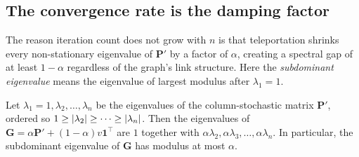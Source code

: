 \subsection{The convergence rate is the damping factor}

The reason iteration count does not grow with $n$ is that teleportation shrinks every non-stationary eigenvalue of $\mathbf{P}'$ by a factor of $\alpha$, creating a spectral gap of at least $1-\alpha$ regardless of the graph's link structure. Here the \emph{subdominant eigenvalue} means the eigenvalue of largest modulus after $\lambda_1 = 1$.

\begin{theorem}
\label{ch36:thm-eigen}
Let $\lambda_1 = 1, \lambda_2, \dots, \lambda_n$ be the eigenvalues of the column-stochastic matrix $\mathbf{P}'$, ordered so $1 \ge \lvert\lambda_2\rvert\ge\dots\ge\lvert\lambda_n\rvert$. Then the eigenvalues of $\mathbf{G} = \alpha\mathbf{P}' + (1-\alpha)v\mathbf{1}^\top$ are $1$ together with $\alpha\lambda_2, \alpha\lambda_3, \dots, \alpha\lambda_n$. In particular, the subdominant eigenvalue of $\mathbf{G}$ has modulus at most $\alpha$.
\end{theorem}

